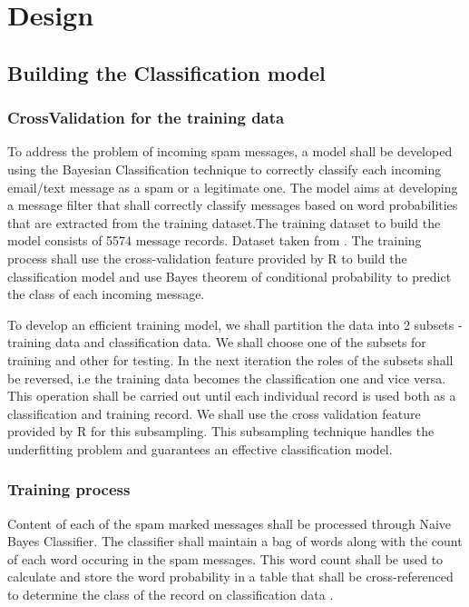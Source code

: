\documentclass[9pt,twocolumn,twoside]{../../styles/osajnl}
\begin{document}
\section{Design}
\subsection{Building the Classification model}

\subsubsection{CrossValidation for the training data}

To address the problem of incoming spam messages, a model shall be
developed using the Bayesian Classification technique to correctly
classify each incoming email/text message as a spam or a legitimate
one. The model aims at developing a message filter that shall
correctly classify messages based on word probabilities that are
extracted from the training dataset.The training dataset to build the
model consists of 5574 message records. Dataset taken from
\cite{www-sms-spam-dataset}. The training process shall use the
cross-validation feature provided by R to build the classification
model and use Bayes theorem of conditional probability to predict the
class of each incoming message.

To develop an efficient training model, we shall partition the data
into 2 subsets - training data and classification data. We shall
choose one of the subsets for training and other for testing. In the
next iteration the roles of the subsets shall be reversed, i.e the
training data becomes the classification one and vice versa. This
operation shall be carried out until each individual record is used
both as a classification and training record. We shall use the cross
validation feature provided by R for this subsampling. This
subsampling technique handles the underfitting problem and guarantees
an effective classification model.


\subsubsection{Training process}
Content of each of the spam marked messages shall be processed through
Naive Bayes Classifier.  The classifier shall maintain a bag of words
along with the count of each word occuring in the spam messages. This
word count shall be used to calculate and store the word probability
in a table that shall be cross-referenced to determine the class of
the record on classification
data \cite{paper-classification-of-email}.
\end{document}
